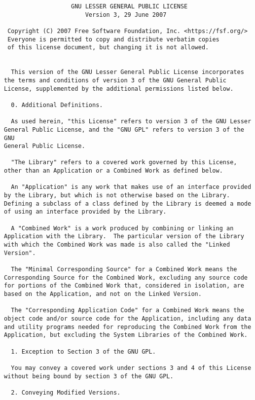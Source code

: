 \documentclass[a4paper]{article}
\begin{document}
\begin{verbatim}
                   GNU LESSER GENERAL PUBLIC LICENSE
                       Version 3, 29 June 2007

 Copyright (C) 2007 Free Software Foundation, Inc. <https://fsf.org/>
 Everyone is permitted to copy and distribute verbatim copies
 of this license document, but changing it is not allowed.


  This version of the GNU Lesser General Public License incorporates
the terms and conditions of version 3 of the GNU General Public
License, supplemented by the additional permissions listed below.

  0. Additional Definitions.

  As used herein, "this License" refers to version 3 of the GNU Lesser
General Public License, and the "GNU GPL" refers to version 3 of the GNU
General Public License.

  "The Library" refers to a covered work governed by this License,
other than an Application or a Combined Work as defined below.

  An "Application" is any work that makes use of an interface provided
by the Library, but which is not otherwise based on the Library.
Defining a subclass of a class defined by the Library is deemed a mode
of using an interface provided by the Library.

  A "Combined Work" is a work produced by combining or linking an
Application with the Library.  The particular version of the Library
with which the Combined Work was made is also called the "Linked
Version".

  The "Minimal Corresponding Source" for a Combined Work means the
Corresponding Source for the Combined Work, excluding any source code
for portions of the Combined Work that, considered in isolation, are
based on the Application, and not on the Linked Version.

  The "Corresponding Application Code" for a Combined Work means the
object code and/or source code for the Application, including any data
and utility programs needed for reproducing the Combined Work from the
Application, but excluding the System Libraries of the Combined Work.

  1. Exception to Section 3 of the GNU GPL.

  You may convey a covered work under sections 3 and 4 of this License
without being bound by section 3 of the GNU GPL.

  2. Conveying Modified Versions.


\end{verbatim}
\end{document}
